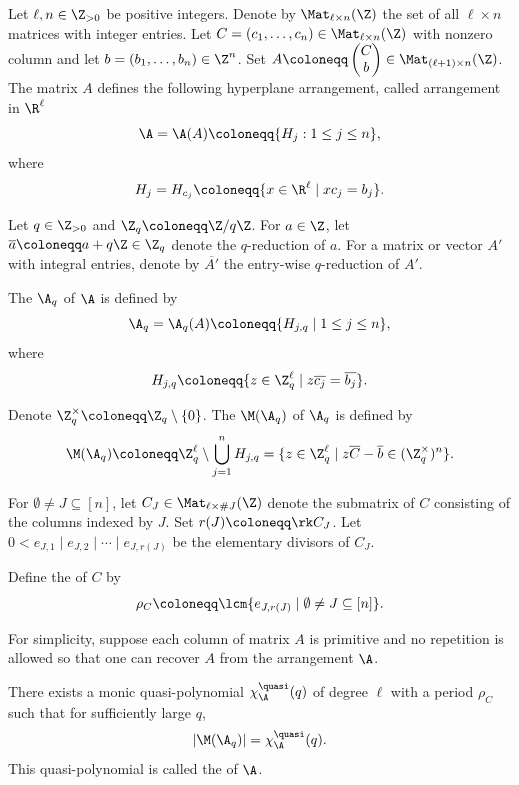 Let $\ell,n\in\Z_{>0}$ be positive integers. 
Denote by $\Mat_{\ell\times n}(\Z)$ the set of all $\ell\times n$ matrices with integer entries. 
Let $C=(c_1,\ldots,c_n) \in \Mat_{\ell\times n}(\Z)$ with nonzero column and let $b=(b_1,\ldots,b_n) \in\Z^n$. 
Set $A  \coloneqq  \begin{pmatrix} C\\ b\end{pmatrix}  \in \Mat_{(\ell + 1)\times n}(\Z)$. 
The matrix $A$ defines the following hyperplane arrangement, called  arrangement in $\R^\ell$
$$\A=\A(A)   \coloneqq  \{ H_j : 1\le j\le n\},$$
where
$$H_j = H_{c_j}   \coloneqq  \{x\in \R^\ell\mid xc_j=b_j\}.$$

Let $q\in\Z_{>0}$ and $\Z_q  \coloneqq \Z/q\Z$. 
 For $a \in \Z$, let $\overline{a}  \coloneqq  a + q\Z \in \Z_q$ denote the $q$-reduction of $a$. 
For a matrix or vector $A'$ with integral entries, denote by $\overline{A'}$ the entry-wise $q$-reduction of $A'$.

The  $\A_q$ of $\A$ is defined by 
$$\A_q =\A_q (A) \coloneqq  \{ H_{j,q} \mid 1\le j\le n\},$$
where
$$H_{j,q}  \coloneqq  \{ z \in \Z_q^\ell \mid z\overline{c_j} =\overline{b_j}\}.$$

Denote $\Z_q^{\times} \coloneqq \Z_q \setminus \{0\}$.
The  $\M(\A_q)$ of $\A_q$ is defined by 
$$\M(\A_q)  \coloneqq  \Z_q^\ell \setminus\bigcup_{j=1}^n H_{j,q} = \{z\in \Z_q^\ell \mid z\overline{C} -\overline{b} \in (\Z_q^{\times})^n\}.$$

For $\emptyset \ne J \subseteq [n]$, let $C_J \in \Mat_{\ell\times \#J}(\Z)$ denote the submatrix of $C$ consisting of the columns indexed by $J$.
Set $r(J) \coloneqq \rk C_J$.
Let $0<e_{J,1} \mid e_{J,2} \mid \cdots \mid e_{J,r(J)}$ be the elementary divisors of $C_J$.

\begin{definition}
\label{def:lcm}
Define the  of $C$ by
$$\rho_C \coloneqq  \lcm \{e_{J,r(J)} \mid \emptyset \ne J \subseteq [n]\}.$$
\end{definition}

For simplicity, suppose each column of matrix $A$ is primitive and no repetition is allowed so that one can recover $A$ from the arrangement $\A$.


\begin{theorem}
\label{thm:KTT}
There exists a monic quasi-polynomial $\chi^{\quasi}_{\A}(q)$ of degree $\ell$ with a period $\rho_{C}$ such that  for sufficiently large $q$,
$$|\M(\A_q) | = \chi^{\quasi}_{\A}(q).$$ 
This quasi-polynomial is called the  of $\A$. 
\end{theorem}

